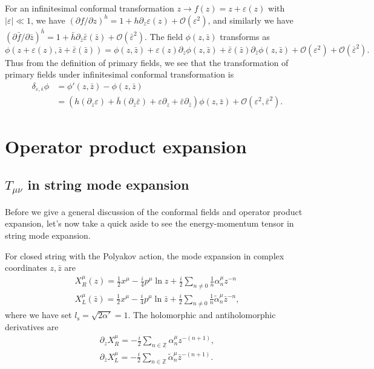 \documentclass[graybox,envcountchap,sectrefs]{svmono}
\begin{document}
For an infinitesimal conformal transformation $z\to f(z)=z+\varepsilon (z)$ with $|\varepsilon|\ll 1$, we have $(\partial f/ \partial z)^h=1+h\partial_z \varepsilon (z)+\mathcal{O}(\varepsilon^2)$, and similarly we have $(\partial \bar{f}/ \partial \bar{z})^{\bar{h}}=1+\bar{h}\partial_{\bar{z}} \bar{\varepsilon} (\bar{z})+\mathcal{O}(\bar{\varepsilon}^2)$.
The field $\phi(z,\bar{z})$ transforms as 
\begin{equation}
\phi(z+\varepsilon(z),\bar{z}+\bar{\varepsilon}(\bar{z}))=\phi(z,\bar{z})+\varepsilon(z)\partial_z\phi(z,\bar{z})+\bar{\varepsilon}(\bar{z})\partial_{\bar{z}}\phi(z,\bar{z})+\mathcal{O}(\varepsilon^2)+\mathcal{O}(\bar{\varepsilon}^2).\nonumber
\end{equation}
Thus from the definition of primary fields, we see that the transformation of primary fields under infinitesimal conformal transformation is
\begin{align}
\delta_{\varepsilon,\bar{\epsilon}}\phi
&=\phi'(z,\bar{z})-\phi(z,\bar{z})\nonumber\\
&=
\left( 
h(\partial_z \varepsilon)+\bar{h}(\partial_{\bar{z}}\bar{\varepsilon})+\varepsilon \partial_z+\bar{\varepsilon}\partial_{\bar{z}}
\right)\phi(z,\bar{z})	+\mathcal{O}(\varepsilon^2,\bar{\varepsilon}^2).
\end{align}



\section{Operator product expansion}

\subsection{$T_{\mu\nu}$ in string mode expansion}
Before we give a general discussion of the conformal fields and operator product expansion, let's now take a quick aside to see the energy-momentum tensor in string mode expansion.

For closed string with the Polyakov action, the mode expansion in complex coordinates $z,\bar{z}$ are
\begin{align}
	X^{\mu}_{R}(z)=\frac{1}{2}x^{\mu}-\frac{i}{4}p^{\mu}\ln z+\frac{i}{2}\sum_{n\neq 0}\frac{1}{n}\alpha_{n}^{\mu}z^{-n}\\
	X^{\mu}_{L}(\bar{z})=\frac{1}{2}x^{\mu}-\frac{i}{4}p^{\mu}\ln \bar{z}+\frac{i}{2}\sum_{n\neq 0}\frac{1}{n}\tilde{\alpha}_{n}^{\mu}\bar{z}^{-n},
\end{align}
where we have set $l_{\mathrm{s}}=\sqrt{2\alpha'}=1$. The holomorphic and antiholomorphic derivatives are
\begin{align}
\partial_{z}X^{\mu}_{R}=-\frac{i}{2}\sum_{n\in\mathbb{Z}}\alpha_{n}^{\mu}z^{-(n+1)},	\\
\partial_{\bar{z}}X^{\mu}_{L}=-\frac{i}{2}\sum_{n\in\mathbb{Z}}\tilde{\alpha}_{n}^{\mu}\bar{z}^{-(n+1)}.
\end{align}
\end{document}
